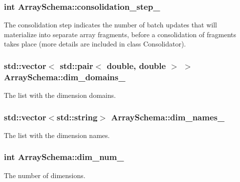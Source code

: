 \subsubsection[{consolidation\+\_\+step\+\_\+}]{\setlength{\rightskip}{0pt plus 5cm}int Array\+Schema\+::consolidation\+\_\+step\+\_\+\hspace{0.3cm}{\ttfamily [private]}}\label{classArraySchema_aa04ac8362f27d541057201dc78a78dc1}
The consolidation step indicates the number of batch updates that will materialize into separate array fragments, before a consolidation of fragments takes place (more details are included in class Consolidator). \hypertarget{classArraySchema_ad345538fc45d45b1cbc47f8601679115}{}
\subsubsection[{dim\+\_\+domains\+\_\+}]{\setlength{\rightskip}{0pt plus 5cm}std\+::vector$<$ std\+::pair$<$ double, double $>$ $>$ Array\+Schema\+::dim\+\_\+domains\+\_\+\hspace{0.3cm}{\ttfamily [private]}}\label{classArraySchema_ad345538fc45d45b1cbc47f8601679115}
The list with the dimension domains. \hypertarget{classArraySchema_a2727572d5457356c8ca2c0d3690fe19a}{}
\subsubsection[{dim\+\_\+names\+\_\+}]{\setlength{\rightskip}{0pt plus 5cm}std\+::vector$<$std\+::string$>$ Array\+Schema\+::dim\+\_\+names\+\_\+\hspace{0.3cm}{\ttfamily [private]}}\label{classArraySchema_a2727572d5457356c8ca2c0d3690fe19a}
The list with the dimension names. \hypertarget{classArraySchema_a3759dcfaf3620ccc7de8920a6f512a84}{}
\subsubsection[{dim\+\_\+num\+\_\+}]{\setlength{\rightskip}{0pt plus 5cm}int Array\+Schema\+::dim\+\_\+num\+\_\+\hspace{0.3cm}{\ttfamily [private]}}\label{classArraySchema_a3759dcfaf3620ccc7de8920a6f512a84}
The number of dimensions. \hypertarget{classArraySchema_ad568c55fb480e4f11fd5fe44e5facbb1}{}
